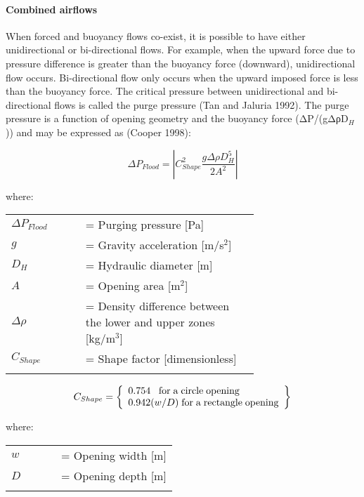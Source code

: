 \paragraph{Combined airflows}\label{combined-airflows}

When forced and buoyancy flows co-exist, it is possible to have either unidirectional or bi-directional flows. For example, when the upward force due to pressure difference is greater than the buoyancy force (downward), unidirectional flow occurs. Bi-directional flow only occurs when the upward imposed force is less than the buoyancy force. The critical pressure between unidirectional and bi-directional flows is called the purge pressure (Tan and Jaluria 1992). The purge pressure is a function of opening geometry and the buoyancy force (ΔP/(gΔρD\(_{H}\))) and may be expressed as (Cooper 1998):

\begin{equation}
\Delta {P_{Flood}} = \left| {C_{Shape}^2\frac{{g\Delta \rho D_H^5}}{{2{A^2}}}} \right|
\end{equation}

where:

\begin{tabular}{lp{0.7\linewidth}}
\\
$\Delta P_{Flood}$ &= Purging pressure [Pa]\\
$g$ &= Gravity acceleration [m/s\(^{2}\)]\\
$D_H$ &= Hydraulic diameter [m]\\
$A$ &= Opening area [m\(^{2}\)]\\
$\Delta \rho$ &= Density difference between the lower and upper zones [kg/m\(^{3}\)]\\
$C_{Shape}$ &= Shape factor [dimensionless]\\
\\
\end{tabular}

\begin{equation}
C_{Shape} = \left\{ \begin{array}{l}0.754\;\;\;{\rm{for}}\;{\rm{a}}\;{\rm{circle}}\;{\rm{opening}}\\0.942(w/D)\;{\rm{for}}\;{\rm{a}}\;{\rm{rectangle}}\;{\rm{opening}}\end{array} \right\}
\end{equation}

where:

\begin{tabular}{lp{0.7\linewidth}}
\\
$w$ &= Opening width [m]\\
$D$ &= Opening depth [m]\\
\\
\end{tabular}

